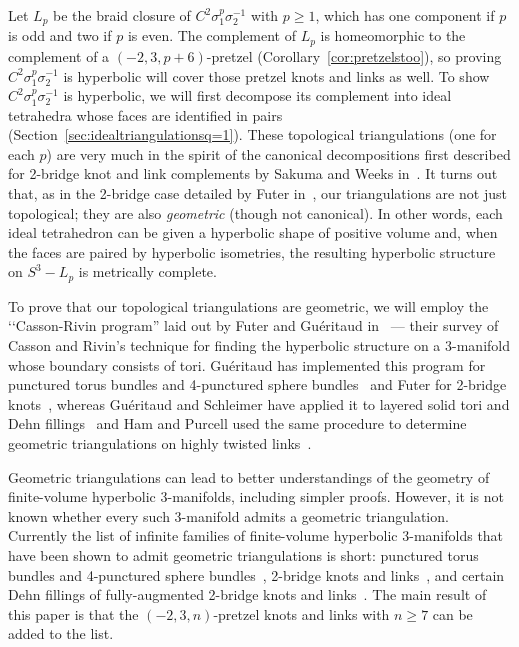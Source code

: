 \documentclass[reqno]{amsart}
\theoremstyle{plain}
\theoremstyle{definition}
\begin{document}
Let $L_p$ be the braid closure of $C^2\sigma_1^p\sigma_2^{-1}$ with $p\ge1$, which has one component if $p$ is odd and two if $p$ is even.  The complement of $L_p$ is homeomorphic to the complement of a $(-2,3,p+6)$-pretzel (Corollary~\ref{cor:pretzelstoo}), so proving $C^2\sigma_1^p\sigma_2^{-1}$ is hyperbolic will cover those pretzel knots and links as well.  To show $C^2\sigma_1^p\sigma_2^{-1}$ is hyperbolic, we will first decompose its complement into ideal tetrahedra whose faces are identified in pairs  (Section~\ref{sec:idealtriangulationsq=1}).  These topological triangulations (one for each $p$) are very much in the spirit of the canonical decompositions first described for 2-bridge knot and link complements by Sakuma and Weeks in~\cite{SakumaWeeks}. It turns out that, as in the 2-bridge case detailed by Futer in~\cite[Appendix]{GwithF2Bridge}, our triangulations are not just topological; they are also \emph{geometric} (though not canonical).  In other words, each ideal tetrahedron can be given a hyperbolic shape of positive volume and, when the faces are paired by hyperbolic isometries, the resulting hyperbolic structure on $S^3-L_p$ is metrically complete. 


To prove that our topological triangulations are geometric, we will employ the \lq\lq Casson-Rivin program'' laid out by Futer and Gu\'eritaud in~\cite{AngledtoHyperbolic} --- their survey of Casson and Rivin's technique for finding the hyperbolic structure on a 3-manifold whose boundary consists of tori.  Gu\'eritaud has implemented this program for punctured torus bundles and 4-punctured sphere bundles~\cite{GwithF2Bridge} and Futer for 2-bridge knots~\cite[Appendix]{GwithF2Bridge}, whereas Gu\'eritaud and Schleimer have applied it to layered solid tori and Dehn fillings~\cite{DehnFillings} and Ham and Purcell used the same procedure to determine geometric triangulations on highly twisted links~\cite{HighlyTwisted}.  


Geometric triangulations can lead to better understandings of the geometry of finite-volume hyperbolic 3-manifolds, including simpler proofs.  However, it is not known whether every such 3-manifold admits a geometric triangulation.  Currently the list of infinite families of finite-volume hyperbolic 3-manifolds that have been shown to admit geometric triangulations is short: punctured torus bundles and 4-punctured sphere bundles~\cite{GwithF2Bridge}, 2-bridge knots and links~\cite[Appendix]{GwithF2Bridge}, and certain Dehn fillings of fully-augmented 2-bridge knots and links~\cite{HighlyTwisted}. The main result of this paper is that the $(-2,3,n)$-pretzel knots and links with $n\ge 7$ can be added to the list. 
\end{document}
